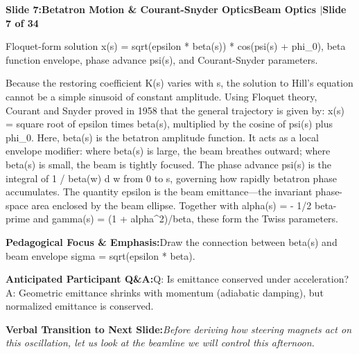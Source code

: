 \documentclass[11pt,a4paper]{article}
\begin{document}
\clearpage
\hypertarget{slide.7}{}
{}
\noindent\begin{tcolorbox}[colback=navy,colframe=navy,left=6pt,right=6pt,top=3pt,bottom=3pt,boxrule=0pt,arc=2pt]
{\large\bfseries\color{white}Slide 7:\enspace Betatron Motion \& Courant-Snyder Optics}\hfill{\footnotesize\bfseries\color{white!85!lightbg}Beam Optics \enspace$|$\enspace Slide 7 of 34}
\end{tcolorbox}
\vspace{0.2em}
\begin{tcolorbox}[colback=lightbg,colframe=bordergray,title={\footnotesize\bfseries\color{darkgray}Slide Visual Blueprint},fontupper=\small,left=6pt,right=6pt,top=2.5pt,bottom=2.5pt,boxrule=0.6pt,arc=2.5pt]
Floquet-form solution x(s) = sqrt(epsilon * beta(s)) * cos(psi(s) + phi\_0), beta function envelope, phase advance psi(s), and Courant-Snyder parameters.
\end{tcolorbox}
\vspace{0.2em}
\begin{tcolorbox}[colback=white,colframe=primaryblue,title={\footnotesize\bfseries\color{white}Spoken Presenter Script},fontupper=\small,left=6pt,right=6pt,top=3pt,bottom=3pt,boxrule=0.8pt,arc=2.5pt]
Because the restoring coefficient K(s) varies with s, the solution to Hill's equation cannot be a simple sinusoid of constant amplitude. Using Floquet theory, Courant and Snyder proved in 1958 that the general trajectory is given by: x(s) = square root of epsilon times beta(s), multiplied by the cosine of psi(s) plus phi\_0. Here, beta(s) is the betatron amplitude function. It acts as a local envelope modifier: where beta(s) is large, the beam breathes outward; where beta(s) is small, the beam is tightly focused. The phase advance psi(s) is the integral of 1 / beta(w) d w from 0 to s, governing how rapidly betatron phase accumulates. The quantity epsilon is the beam emittance—the invariant phase-space area enclosed by the beam ellipse. Together with alpha(s) = - 1/2 beta-prime and gamma(s) = (1 + alpha\textasciicircum{}2)/beta, these form the Twiss parameters.
\end{tcolorbox}
\vspace{0.2em}
\begin{tcolorbox}[colback=lightbg,colframe=bordergray,left=6pt,right=6pt,top=3pt,bottom=3pt,boxrule=0.6pt,arc=2.5pt]
\small
\noindent\textbf{\color{navy}Pedagogical Focus \& Emphasis:}\enspace Draw the connection between beta(s) and beam envelope sigma = sqrt(epsilon * beta).\par\vspace{0.3em}
\noindent\textbf{\color{successgreen}Anticipated Participant Q\&A:}\enspace Q: Is emittance conserved under acceleration? A: Geometric emittance shrinks with momentum (adiabatic damping), but normalized emittance is conserved.\par\vspace{0.3em}
\noindent\textbf{\color{accent}Verbal Transition to Next Slide:}\enspace \emph{Before deriving how steering magnets act on this oscillation, let us look at the beamline we will control this afternoon.}
\end{tcolorbox}
\end{document}
